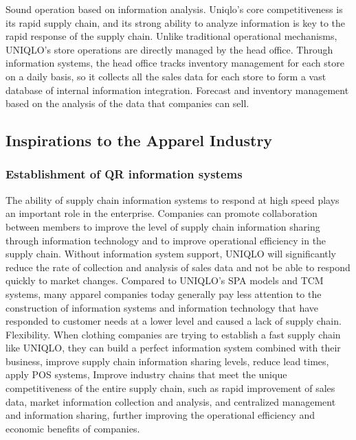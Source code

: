 \documentclass[12pt,]{article}
\begin{document}
Sound operation based on information analysis. Uniqlo's core
competitiveness is its rapid supply chain, and its strong ability to
analyze information is key to the rapid response of the supply chain.
Unlike traditional operational mechanisms, UNIQLO's store operations are
directly managed by the head office. Through information systems, the
head office tracks inventory management for each store on a daily basis,
so it collects all the sales data for each store to form a vast database
of internal information integration. Forecast and inventory management
based on the analysis of the data that companies can sell.

\hypertarget{inspirations-to-the-apparel-industry}{%
\subsection{Inspirations to the Apparel
Industry}\label{inspirations-to-the-apparel-industry}}

\hypertarget{establishment-of-qr-information-systems}{%
\subsubsection{Establishment of QR information
systems}\label{establishment-of-qr-information-systems}}

The ability of supply chain information systems to respond at high speed
plays an important role in the enterprise. Companies can promote
collaboration between members to improve the level of supply chain
information sharing through information technology and to improve
operational efficiency in the supply chain. Without information system
support, UNIQLO will significantly reduce the rate of collection and
analysis of sales data and not be able to respond quickly to market
changes. Compared to UNIQLO's SPA models and TCM systems, many apparel
companies today generally pay less attention to the construction of
information systems and information technology that have responded to
customer needs at a lower level and caused a lack of supply chain.
Flexibility. When clothing companies are trying to establish a fast
supply chain like UNIQLO, they can build a perfect information system
combined with their business, improve supply chain information sharing
levels, reduce lead times, apply POS systems, Improve industry chains
that meet the unique competitiveness of the entire supply chain, such as
rapid improvement of sales data, market information collection and
analysis, and centralized management and information sharing, further
improving the operational efficiency and economic benefits of companies.
\end{document}

